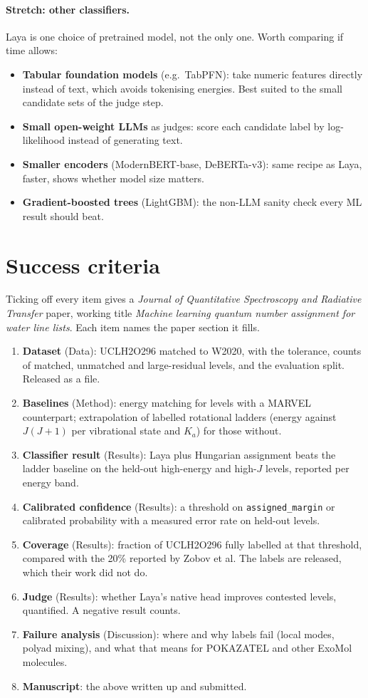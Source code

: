 \documentclass[11pt,a4paper]{article}
\begin{document}
\paragraph{Stretch: other classifiers.} Laya is one choice of pretrained model, not the only one. Worth comparing if time allows:
\begin{itemize}
  \item \textbf{Tabular foundation models} (e.g.\ TabPFN): take numeric features directly instead of text, which avoids tokenising energies. Best suited to the small candidate sets of the judge step.
  \item \textbf{Small open-weight LLMs} as judges: score each candidate label by log-likelihood instead of generating text.
  \item \textbf{Smaller encoders} (ModernBERT-base, DeBERTa-v3): same recipe as Laya, faster, shows whether model size matters.
  \item \textbf{Gradient-boosted trees} (LightGBM): the non-LLM sanity check every ML result should beat.
\end{itemize}

\section{Success criteria}

Ticking off every item gives a \emph{Journal of Quantitative Spectroscopy and Radiative Transfer} paper, working title \emph{Machine learning quantum number assignment for water line lists}. Each item names the paper section it fills.
\begin{enumerate}
  \item \textbf{Dataset} (Data): UCLH2O296 matched to W2020, with the tolerance, counts of matched, unmatched and large-residual levels, and the evaluation split. Released as a file.
  \item \textbf{Baselines} (Method): energy matching for levels with a MARVEL counterpart; extrapolation of labelled rotational ladders (energy against $J(J+1)$ per vibrational state and $K_a$) for those without.
  \item \textbf{Classifier result} (Results): Laya plus Hungarian assignment beats the ladder baseline on the held-out high-energy and high-$J$ levels, reported per energy band.
  \item \textbf{Calibrated confidence} (Results): a threshold on \texttt{assigned\_margin} or calibrated probability with a measured error rate on held-out levels.
  \item \textbf{Coverage} (Results): fraction of UCLH2O296 fully labelled at that threshold, compared with the 20\% reported by Zobov et al. The labels are released, which their work did not do.
  \item \textbf{Judge} (Results): whether Laya's native head improves contested levels, quantified. A negative result counts.
  \item \textbf{Failure analysis} (Discussion): where and why labels fail (local modes, polyad mixing), and what that means for POKAZATEL and other ExoMol molecules.
  \item \textbf{Manuscript}: the above written up and submitted.
\end{enumerate}
\end{document}
